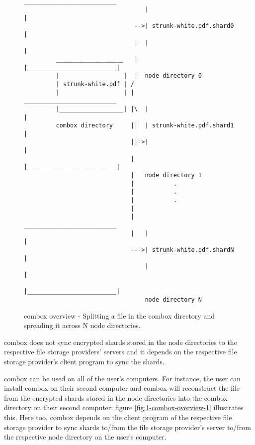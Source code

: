 \begin{figure}[h]
\begin{verbatim}

                                  __________________________
                                  |                         |
                               -->| strunk-white.pdf.shard0 |
                               |  |                         |
         ___________________   |  |_________________________|
         |                  |  |  node directory 0
         | strunk-white.pdf | /
         |                  | |   __________________________
         |__________________| |\  |                         |
         combox directory     ||  | strunk-white.pdf.shard1 |
                              ||->|                         |
                              |   |_________________________|
                              |   node directory 1
                              |           .
                              |           .
                              |           .
                              |
                              |   __________________________
                              |   |                         |
                              --->| strunk-white.pdf.shardN |
                                  |                         |
                                  |_________________________|
                                  node directory N
\end{verbatim}
  \caption{combox overview - Splitting a file in the combox directory
    and spreading it across N node directories.}
\label{fig:1-combox-overview-0}
\end{figure}

combox does not sync encrypted shards stored in the node directories
to the respective file storage providers' servers and it depends on the
respective file storage provider's client program to sync the
shards.

combox can be used on all of the user's computers. For instance, the
user can install combox on their second computer and combox will
reconstruct the file from the encrypted shards stored in the node
directories into the combox directory on their second computer; figure
\ref{fig:1-combox-overview-1} illustrates this. Here too, combox
depends on the client program of the respective file storage provider
to sync shards to/from the file storage provider's server to/from the
respective node directory on the user's computer.

